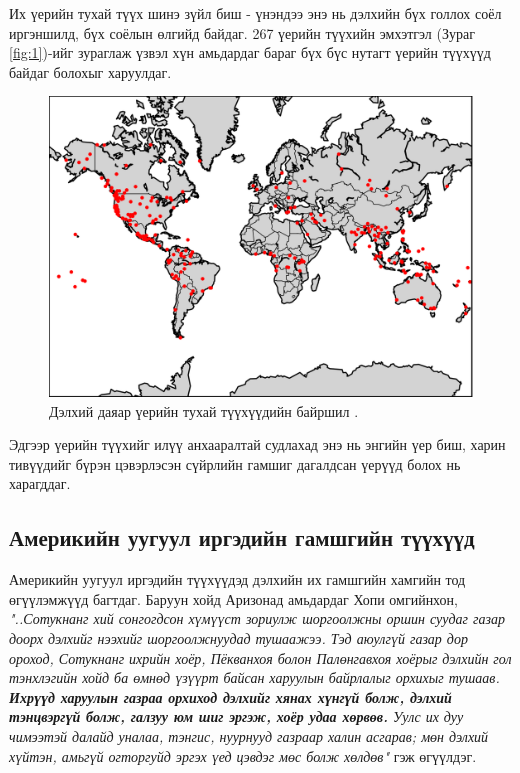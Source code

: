 \documentclass[10pt,twocolumn,letterpaper]{article}
\begin{document}
Их үерийн тухай түүх шинэ зүйл биш - үнэндээ энэ нь дэлхийн бүх голлох соёл иргэншилд, бүх соёлын өлгийд байдаг. 267 үерийн түүхийн эмхэтгэл (Зураг \ref{fig:1})\cite{3}-ийг зураглаж үзвэл хүн амьдардаг бараг бүх бүс нутагт үерийн түүхүүд байдаг болохыг харуулдаг.
\begin{figure}[h]
\begin{center}
   \includegraphics[width=1\linewidth]{b.png}
\end{center}
   \caption{Дэлхий даяар үерийн тухай түүхүүдийн байршил \cite{3}.}
\label{fig:1}
\label{fig:onecol}
\end{figure}

Эдгээр үерийн түүхийг илүү анхааралтай судлахад энэ нь энгийн үер биш, харин тивүүдийг бүрэн цэвэрлэсэн сүйрлийн гамшиг дагалдсан үерүүд болох нь харагддаг.

\subsection{Америкийн уугуул иргэдийн гамшгийн түүхүүд}

Америкийн уугуул иргэдийн түүхүүдэд дэлхийн их гамшгийн хамгийн тод өгүүлэмжүүд багтдаг. Баруун хойд Аризонад амьдардаг Хопи омгийнхон, \textit{"..Сотукнанг хий сонгогдсон хүмүүст зориулж шоргоолжны оршин суудаг газар доорх дэлхийг нээхийг шоргоолжнуудад тушаажээ. Тэд аюулгүй газар дор ороход, Сотукнанг ихрийн хоёр, Пёкванхоя болон Палөнгавхоя хоёрыг дэлхийн гол тэнхлэгийн хойд ба өмнөд үзүүрт байсан харуулын байрлалыг орхихыг тушаав. \textbf{Ихрүүд харуулын газраа орхиход дэлхийг хянах хүнгүй болж, дэлхий тэнцвэргүй болж, галзуу юм шиг эргэж, хоёр удаа хөрвөв.} Уулс их дуу чимээтэй далайд уналаа, тэнгис, нуурнууд газраар халин асгарав; мөн дэлхий хүйтэн, амьгүй огторгуйд эргэх үед цэвдэг мөс болж хөлдөв"} \cite{4} гэж өгүүлдэг.
\end{document}
